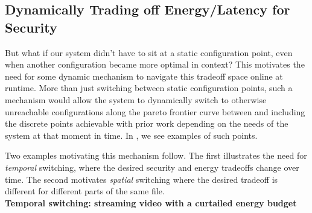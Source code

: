 \subsection{Dynamically Trading off Energy/Latency for Security}


But what if our system didn't have to sit at a static configuration point, even
when another configuration became more optimal in context? This motivates the
need for some dynamic mechanism to navigate this tradeoff space online at
runtime. More than just switching between static configuration points, such a
mechanism would allow the system to dynamically switch to otherwise unreachable
configurations along the pareto frontier curve between and including the
discrete points achievable with prior work depending on the needs of the system
at that moment in time. In , we see examples of
such points. 

Two examples motivating this mechanism follow. The first illustrates the need
for \emph{temporal} switching, where the desired security and energy tradeoffs
change over time.  The second motivates \emph{spatial} switching where the
desired tradeoff is different for different parts of the same file.\\


\noindent
\textbf{Temporal switching: streaming video with a curtailed energy budget}

 

